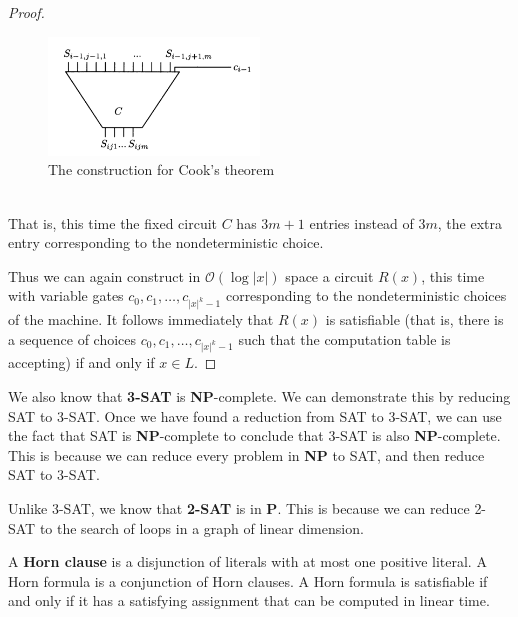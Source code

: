 \documentclass[12pt]{article}
\begin{document}
\begin{proof}
\begin{figure}[ht]
  \centering
  \includegraphics[width=0.5\textwidth]{img/cook2.png}
  \caption{The construction for Cook's theorem}
\end{figure}
\\
That is, this time the fixed circuit $C$ has $3m + 1$ entries instead of $3m$, the extra entry corresponding to the nondeterministic choice.

Thus we can again construct in $\mathcal{O}(\log |x|)$ space a circuit $R(x)$, this time with variable gates $c_0, c_1, \ldots, c_{|x|^k - 1}$ corresponding to the nondeterministic choices of the machine. It follows immediately that $R(x)$ is satisfiable (that is, there is a sequence of choices $c_0, c_1, \ldots, c_{|x|^k - 1}$ such that the computation table is accepting) if and only if $x \in L$.

\end{proof}
\begin{defbox}
  We also know that \textbf{3-SAT} is \textbf{NP}-complete. We can demonstrate this by reducing \textsc{SAT} to \textsc{3-SAT}. Once we have found a reduction from \textsc{SAT} to \textsc{3-SAT}, we can use the fact that \textsc{SAT} is \textbf{NP}-complete to conclude that \textsc{3-SAT} is also \textbf{NP}-complete. This is because we can reduce every problem in \textbf{NP} to \textsc{SAT}, and then reduce \textsc{SAT} to \textsc{3-SAT}.
\end{defbox}
\begin{defbox}[2-SAT is in P]
  Unlike 3-SAT, we know that \textbf{2-SAT} is in \textbf{P}. This is because we can reduce \textsc{2-SAT} to the search of loops in a graph of linear dimension.
\end{defbox}
\begin{defbox}
  A \textbf{Horn clause} is a disjunction of literals with at most one positive literal. A Horn formula is a conjunction of Horn clauses. A Horn formula is satisfiable if and only if it has a satisfying assignment that can be computed in linear time.
\end{defbox}
\end{document}
